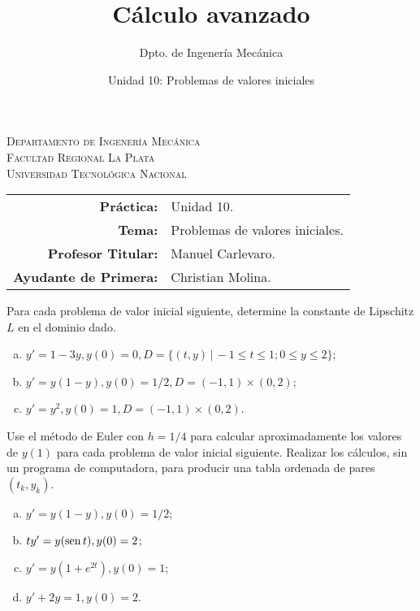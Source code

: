 \documentclass[11pt]{article}
\title{Cálculo avanzado}
\author{Dpto. de Ingenería Mecánica}
\date{Unidad 10: Problemas de valores iniciales}
\begin{document}

\begin{center}
\end{center} 

\begin{center}
\vspace{\baselineskip}
\Large{\textsc{Departamento de Ingenería Mecánica}} \\
\textsc{Facultad Regional La Plata} \\
\textsc{Universidad Tecnológica Nacional}
\end{center}


\begin{center}
\begin{tabular}{r l}
    \textbf{Práctica:} & Unidad 10. \\
 \textbf{Tema:} & Problemas de valores iniciales. \\
 \textbf{Profesor Titular:} & Manuel Carlevaro. \\
 \textbf{Ayudante de Primera:} & Christian Molina. \\
\end{tabular}\end{center}

\vspace{1em}

\begin{question} %
Para cada problema de valor inicial siguiente, determine la constante de Lipschitz $L$ en el dominio dado.
\begin{enumerate}[a)]
    \item $y' = 1 - 3y, y(0) = 0, D = \{(t, y) \, | \, -1 \leq t \leq 1; 0 \leq y \leq 2 \}$;
    \item $y' = y(1-y), y(0) = 1/2, D = (-1, 1) \times (0, 2)$;
    \item $y' = y^2, y(0) = 1, D = (-1, 1) \times (0, 2)$.
\end{enumerate}
\end{question}

\begin{question} %
Use el método de Euler con $h = 1/4$ para calcular aproximadamente los valores de $y(1)$ para cada problema de valor inicial siguiente. Realizar los cálculos, sin un programa de computadora, para producir una tabla ordenada de pares $(t_k, y_k)$.
\begin{enumerate}[a)]
    \item $y' = y(1-y), y(0) = 1/2$;
    \item $t y' = y(\operatorname{sen} t), y(0) = 2$;
    \item $y' = y(1 + e^{2 t}), y(0) = 1$;
    \item $y' + 2 y = 1, y(0) = 2$.
\end{enumerate}
\end{question}
\end{document}
